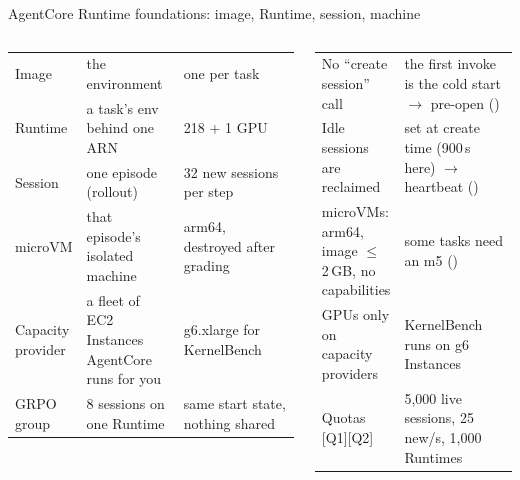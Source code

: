 \begin{frame}{AgentCore Runtime foundations: image, Runtime, session, machine}
\begin{columns}[T]
\begin{tabularx}{\linewidth}{@{}P{0.24\linewidth}P{0.34\linewidth}Y@{}}
\midrule
Image & the environment & one per task\\
Runtime & a task's env behind one ARN & 218  + 1 GPU\\
Session & one episode (rollout) & 32 new sessions per step\\
microVM & that episode's isolated machine & arm64, destroyed after grading\\
Capacity provider & a fleet of EC2 Instances AgentCore runs for you & g6.xlarge for KernelBench\\
GRPO group & 8 sessions on one Runtime & same start state, nothing shared\\
\bottomrule
\end{tabularx}
\par\vspace{1mm}
\tiny\setlength{\tabcolsep}{3pt}
\begin{tabularx}{\linewidth}{@{}P{0.40\linewidth}Y@{}}
\toprule
No ``create session'' call & the first invoke is the cold start $\rightarrow$ pre-open ()\\
Idle sessions are reclaimed & set at create time (900\,s here) $\rightarrow$ heartbeat ()\\
microVMs: arm64, image $\le$ 2\,GB, no capabilities & some tasks need an m5 ()\\
GPUs only on capacity providers & KernelBench runs on g6 Instances\\
Quotas [Q1][Q2] & 5{,}000 live sessions, 25 new/s, 1{,}000 Runtimes\\
\bottomrule
\end{tabularx}
\end{columns}
\end{frame}



